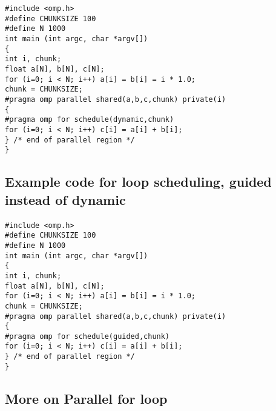 \documentclass[%
oneside,                 %
final,                   %
10pt]{article}
\begin{document}
\begin{verbatim}
#include <omp.h>
#define CHUNKSIZE 100
#define N 1000
int main (int argc, char *argv[])
{
int i, chunk;
float a[N], b[N], c[N];
for (i=0; i < N; i++) a[i] = b[i] = i * 1.0;
chunk = CHUNKSIZE;
#pragma omp parallel shared(a,b,c,chunk) private(i)
{
#pragma omp for schedule(dynamic,chunk)
for (i=0; i < N; i++) c[i] = a[i] + b[i];
} /* end of parallel region */
}

\end{verbatim}



\subsection*{Example code for loop scheduling, guided instead of dynamic}

\paragraph{}
















\begin{verbatim}
#include <omp.h>
#define CHUNKSIZE 100
#define N 1000
int main (int argc, char *argv[])
{
int i, chunk;
float a[N], b[N], c[N];
for (i=0; i < N; i++) a[i] = b[i] = i * 1.0;
chunk = CHUNKSIZE;
#pragma omp parallel shared(a,b,c,chunk) private(i)
{
#pragma omp for schedule(guided,chunk)
for (i=0; i < N; i++) c[i] = a[i] + b[i];
} /* end of parallel region */
}

\end{verbatim}



\subsection*{More on Parallel for loop}

\end{document}
